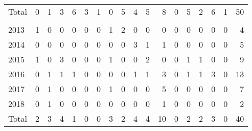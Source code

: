 \documentclass[a4paper]{article}
\begin{document}
\begin{table}
{\begin{tabular}[t]{lrrrrrrrrrrrrrrrrr}
\hspace{1em}\hspace{1em}Total & 0 & 1 & 3 & 6 & 3 & 1 & 0 & 5 & 4 & 5 & 8 & 0 & 5 & 2 & 6 & 1 & 50\\
\addlinespace[0.3em]
\multicolumn{18}{l}{\textbf{Male}}\\
\hspace{1em}\hspace{1em}2013 & 1 & 0 & 0 & 0 & 0 & 0 & 1 & 2 & 0 & 0 & 0 & 0 & 0 & 0 & 0 & 0 & 4\\
\hspace{1em}\hspace{1em}2014 & 0 & 0 & 0 & 0 & 0 & 0 & 0 & 0 & 3 & 1 & 1 & 0 & 0 & 0 & 0 & 0 & 5\\
\hspace{1em}\hspace{1em}2015 & 1 & 0 & 3 & 0 & 0 & 0 & 1 & 0 & 0 & 2 & 0 & 0 & 1 & 1 & 0 & 0 & 9\\
\hspace{1em}\hspace{1em}2016 & 0 & 1 & 1 & 1 & 0 & 0 & 0 & 0 & 1 & 1 & 3 & 0 & 1 & 1 & 3 & 0 & 13\\
\hspace{1em}\hspace{1em}2017 & 0 & 1 & 0 & 0 & 0 & 0 & 1 & 0 & 0 & 0 & 5 & 0 & 0 & 0 & 0 & 0 & 7\\
\hspace{1em}\hspace{1em}2018 & 0 & 1 & 0 & 0 & 0 & 0 & 0 & 0 & 0 & 0 & 1 & 0 & 0 & 0 & 0 & 0 & 2\\
\hspace{1em}\hspace{1em}Total & 2 & 3 & 4 & 1 & 0 & 0 & 3 & 2 & 4 & 4 & 10 & 0 & 2 & 2 & 3 & 0 & 40\\
\bottomrule
\end{tabular}}
\end{table}
\end{document}
